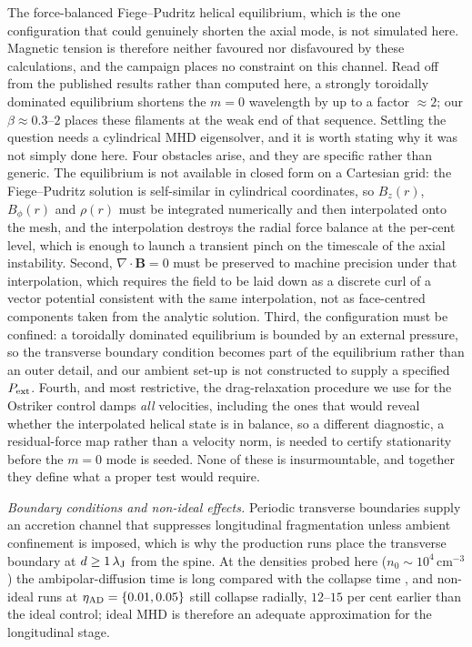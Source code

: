 \documentclass[usenatbib,twoside,twocolumn]{mnras}
\begin{document}
The force-balanced Fiege--Pudritz helical equilibrium, which is the one configuration that could genuinely shorten the axial mode, is not simulated here. Magnetic tension is therefore neither favoured nor disfavoured by these calculations, and the campaign places no constraint on this channel. Read off from the published \citet{Fiege2000} results rather than computed here, a strongly toroidally dominated equilibrium shortens the $m=0$ wavelength by up to a factor $\approx2$; our $\beta\approx0.3$--$2$ places these filaments at the weak end of that sequence. Settling the question needs a cylindrical MHD eigensolver, and it is worth stating why it was not simply done here. Four obstacles arise, and they are specific rather than generic. The equilibrium is not available in closed form on a Cartesian grid: the Fiege--Pudritz solution is self-similar in cylindrical coordinates, so $B_z(r)$, $B_\phi(r)$ and $\rho(r)$ must be integrated numerically and then interpolated onto the mesh, and the interpolation destroys the radial force balance at the per-cent level, which is enough to launch a transient pinch on the timescale of the axial instability. Second, $\nabla\!\cdot\!\mathbf{B}=0$ must be preserved to machine precision under that interpolation, which requires the field to be laid down as a discrete curl of a vector potential consistent with the same interpolation, not as face-centred components taken from the analytic solution. Third, the configuration must be confined: a toroidally dominated equilibrium is bounded by an external pressure, so the transverse boundary condition becomes part of the equilibrium rather than an outer detail, and our ambient set-up is not constructed to supply a specified $P_{\rm ext}$. Fourth, and most restrictive, the drag-relaxation procedure we use for the Ostriker control damps \emph{all} velocities, including the ones that would reveal whether the interpolated helical state is in balance, so a different diagnostic, a residual-force map rather than a velocity norm, is needed to certify stationarity before the $m=0$ mode is seeded. None of these is insurmountable, and together they define what a proper test would require.

\emph{Boundary conditions and non-ideal effects.} Periodic transverse boundaries supply an accretion channel that suppresses longitudinal fragmentation unless ambient confinement is imposed, which is why the production runs place the transverse boundary at $d\geq1\,\lambda_{\rm J}$ from the spine. At the densities probed here ($n_0\sim10^4$\,cm$^{-3}$) the ambipolar-diffusion time is long compared with the collapse time \citep{Tassis2004}, and non-ideal runs at $\eta_{\rm AD}=\{0.01,0.05\}$ still collapse radially, $12$--$15$ per cent earlier than the ideal control; ideal MHD is therefore an adequate approximation for the longitudinal stage.
\end{document}
